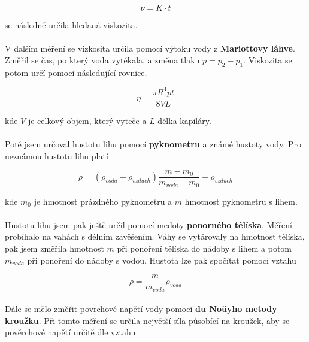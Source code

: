 \documentclass[a4paper,11pt]{article}
\begin{document}
    
    \begin{equation}
        \nu = K \cdot t
    \end{equation}

    se následně určila hledaná viskozita.

    \paragraph{} V dalším měření se vizkosita určila pomocí výtoku vody z 
    \textbf{Mariottovy láhve}. Změřil se čas, po který voda vytékala, a změna tlaku 
    $p = p_{2} - p_{1}$. Viskozita se potom určí pomocí následující rovnice.

    \begin{equation}
        \eta = \frac{\pi R^{4} p t}{8 V L}
    \end{equation}

    kde $V$ je celkový objem, který vyteče a $L$ délka kapiláry. 

    \paragraph{} Poté jsem určoval hustotu lihu pomocí \textbf{pyknometru} a známé
    hustoty vody. Pro neznámou hustotu lihu platí

    \begin{equation}
        \rho = (\rho_{voda} - \rho_{vzduch}) \frac{m - m_{0}}{m_{voda} - m_{0}} 
        + \rho_{vzduch}
    \end{equation}

    kde $m_{0}$ je hmotnost prázdného pyknometru a $m$ hmotnost pyknometru s lihem.

    \paragraph{} Hustotu lihu jsem pak ještě určil pomocí medoty \textbf{ponorného
    tělíska}.  Měření probíhalo na vahách s délním zavěšením. Váhy se vytárovaly na 
    hmotnost tělíska, pak jsem změřila hmotnost $m$ při ponoření tělíska do nádoby 
    s lihem a potom $m_{voda}$ při ponoření do nádoby s vodou. Hustota lze pak spočítat
    pomocí vztahu

    \begin{equation}
        \rho = \frac{m}{m_{voda}} \rho_{voda}
    \end{equation}

    \paragraph{} Dále se mělo změřit povrchové napětí vody pomocí \textbf{du Noüyho 
    metody kroužku}. Při tomto měření se určila největší síla působící na kroužek,
    aby se pověrchové napětí určitě dle vztahu
\end{document}
